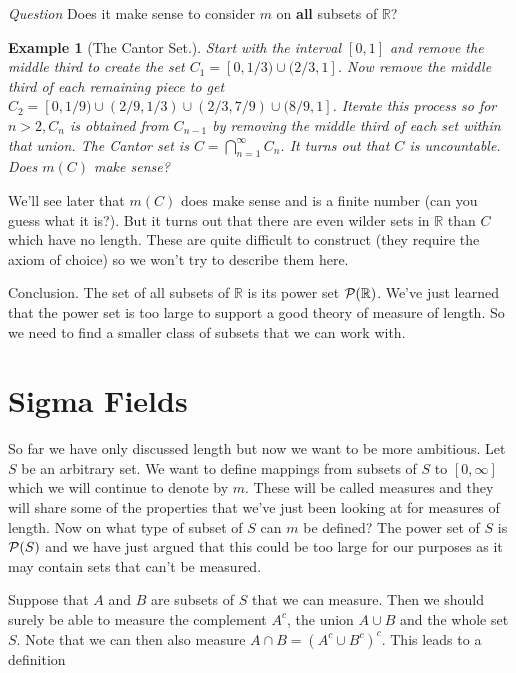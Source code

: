 \documentclass[a4paper]{report}
\newcounter{thm_counter}[chapter]
\newtheorem{example}[thm_counter]{Example}
\numberwithin{equation}{chapter}
\numberwithin{thm_counter}{section}
\def\mb{\mathbb} %
\def\R{\mb{R}} %
\begin{document}
 

{\it Question} Does it make sense to consider $m$ on {\bf all} subsets of $\R$?

 

\begin{example}
[The Cantor Set.] Start with the interval $[0,1]$ and remove the middle third to create the set $C_{1} = [0, 1/3) \cup (2/3, 1]$. Now remove the middle third of each remaining piece to get $C_{2} = [0, 1/9) \cup (2/9, 1/3) \cup (2/3, 7/9) \cup (8/9, 1]$. Iterate this process so for $n > 2, C_{n}$ is obtained from $C_{n-1}$ by removing the middle third of each set within that union. The {\it Cantor set} is $C = \bigcap_{n=1}^{\infty}C_{n}$. It turns out that $C$ is uncountable. Does $m(C)$ make sense?
\end{example}
 

We'll see later that $m(C)$ does make sense and is a finite number (can you guess what it is?). But it turns out that there are even wilder sets in $\R$ than $C$ which have no length. These are quite difficult to construct (they require the axiom of choice) so we won't try to describe them here.



Conclusion. The set of all subsets of $\R$ is its power set ${\cal P}(\R)$. We've just learned that the power set is too large to support a good theory of measure of length. So we need to find a smaller class of subsets that we can work with.



\newpage
\section{Sigma Fields}
So far we have only discussed length but now we want to be more ambitious. Let $S$ be an arbitrary set. We want to define mappings from subsets of $S$ to $[0, \infty]$ which we will continue to denote by $m$. These will be called measures and they will share some of the properties that we've just been looking at for measures of length. Now on what type of subset of $S$ can $m$ be defined? The power set of $S$ is ${\cal P}(S)$ and we have just argued that this could be too large for our purposes as it may contain sets that can't be measured.

Suppose that $A$ and $B$ are subsets of $S$ that we can measure. Then we should surely be able to measure the complement $A^{c}$, the union $A \cup B$ and the whole set $S$. Note that we can then also measure $A \cap B = (A^{c} \cup B^{c})^{c}$. This leads to a definition
\end{document}
